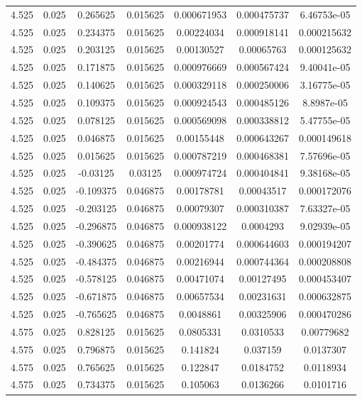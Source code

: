 \begin{flushleft}
\begin{longtable}{ccccccc}
4.525 & 0.025 & 0.265625 & 0.015625 & 0.000671953 & 0.000475737 & 6.46753e-05  \\ 
4.525 & 0.025 & 0.234375 & 0.015625 & 0.00224034 & 0.000918141 & 0.000215632  \\ 
4.525 & 0.025 & 0.203125 & 0.015625 & 0.00130527 & 0.00065763 & 0.000125632  \\ 
4.525 & 0.025 & 0.171875 & 0.015625 & 0.000976669 & 0.000567424 & 9.40041e-05  \\ 
4.525 & 0.025 & 0.140625 & 0.015625 & 0.000329118 & 0.000250006 & 3.16775e-05  \\ 
4.525 & 0.025 & 0.109375 & 0.015625 & 0.000924543 & 0.000485126 & 8.8987e-05  \\ 
4.525 & 0.025 & 0.078125 & 0.015625 & 0.000569098 & 0.000338812 & 5.47755e-05  \\ 
4.525 & 0.025 & 0.046875 & 0.015625 & 0.00155448 & 0.000643267 & 0.000149618  \\ 
4.525 & 0.025 & 0.015625 & 0.015625 & 0.000787219 & 0.000468381 & 7.57696e-05  \\ 
4.525 & 0.025 & -0.03125 & 0.03125 & 0.000974724 & 0.000404841 & 9.38168e-05  \\ 
4.525 & 0.025 & -0.109375 & 0.046875 & 0.00178781 & 0.00043517 & 0.000172076  \\ 
4.525 & 0.025 & -0.203125 & 0.046875 & 0.00079307 & 0.000310387 & 7.63327e-05  \\ 
4.525 & 0.025 & -0.296875 & 0.046875 & 0.000938122 & 0.0004293 & 9.02939e-05  \\ 
4.525 & 0.025 & -0.390625 & 0.046875 & 0.00201774 & 0.000644603 & 0.000194207  \\ 
4.525 & 0.025 & -0.484375 & 0.046875 & 0.00216944 & 0.000744364 & 0.000208808  \\ 
4.525 & 0.025 & -0.578125 & 0.046875 & 0.00471074 & 0.00127495 & 0.000453407  \\ 
4.525 & 0.025 & -0.671875 & 0.046875 & 0.00657534 & 0.00231631 & 0.000632875  \\ 
4.525 & 0.025 & -0.765625 & 0.046875 & 0.0048861 & 0.00325906 & 0.000470286  \\ 
4.575 & 0.025 & 0.828125 & 0.015625 & 0.0805331 & 0.0310533 & 0.00779682  \\ 
4.575 & 0.025 & 0.796875 & 0.015625 & 0.141824 & 0.037159 & 0.0137307  \\ 
4.575 & 0.025 & 0.765625 & 0.015625 & 0.122847 & 0.0184752 & 0.0118934  \\ 
4.575 & 0.025 & 0.734375 & 0.015625 & 0.105063 & 0.0136266 & 0.0101716  \\ 

\end{longtable}
\end{flushleft}
